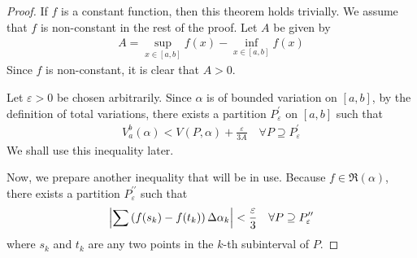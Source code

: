 \documentclass[thmcnt=section, 12pt]{my-elegantbook}
\begin{document}
\begin{proof}
    If $f$ is a constant function, then this theorem holds trivially. We assume that $f$ is non-constant in the rest of the proof. Let $A$ be given by
    \begin{align*}
        A = \sup_{x \in [a, b]} f(x) - \inf_{x \in [a, b]} f(x)
    \end{align*}
    Since $f$ is non-constant, it is clear that $A > 0$.

    Let $\varepsilon > 0$ be chosen arbitrarily. Since $\alpha$ is of bounded variation on $[a, b]$, by the definition of total variations, there exists a partition $P^\prime_\varepsilon$ on $[a, b]$ such that
    \begin{align}
        V_a^b(\alpha)
        < V(P, \alpha)
        + \frac{\varepsilon}{3A}
        \quad \forall P \supseteq P^\prime_\varepsilon
        \label{eq:85}
    \end{align}
    We shall use this inequality later.

    \par Now, we prepare another inequality that will be in use. Because $f \in \mathfrak{R}(\alpha)$, there exists a partition $P^{\prime\prime}_\varepsilon$ such that
    \begin{align}
        \left\lvert 
            \sum \left(f(s_k) - f(t_k)\right)
            \Delta \alpha_k
         \right\rvert < \frac{\varepsilon}{3}
        \quad \forall P \supseteq P^{\prime\prime}_\varepsilon
        \label{eq:86}
    \end{align}
    where $s_k$ and $t_k$ are any two points in the $k$-th subinterval of $P$.


\end{proof}
\end{document}
